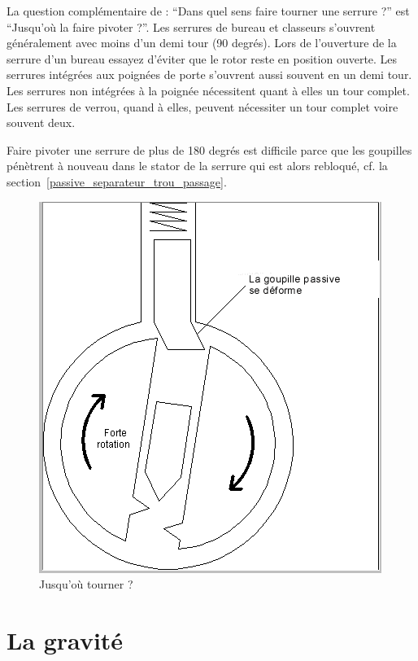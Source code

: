 \documentclass[a4paper,french,11pt,twoside]{report}
\begin{document}
La question complémentaire de : \enquote{Dans quel sens faire tourner une serrure ?} est \enquote{Jusqu'où la faire pivoter ?}. Les serrures de bureau et classeurs s'ouvrent généralement avec moins d'un demi tour (90 degrés). Lors de l'ouverture de la serrure d'un bureau essayez d'éviter que le rotor reste en position ouverte. Les serrures intégrées aux poignées de porte s'ouvrent aussi souvent en un demi tour. Les serrures non intégrées à la poignée nécessitent quant à elles un tour complet. Les serrures de verrou, quand à elles, peuvent nécessiter un tour complet voire souvent deux.

Faire pivoter une serrure de plus de 180 degrés est difficile parce que les goupilles pénètrent à nouveau dans le stator de la serrure qui est alors rebloqué, cf. la section~\ref{passive_separateur_trou_passage}.


\begin{figure}[h] \begin{center}
        \includegraphics[scale=0.7]{images/Image18}
        \caption{Jusqu'où tourner ?}
\end{center} \end{figure}


\section{La gravité}
\end{document}
